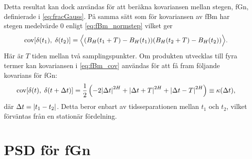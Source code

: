 Detta resultat kan dock användas för att beräkna kovariansen mellan stegen, fGn, definierade i \eqref{eq:fracGauss}. På samma sätt som för kovariansen av fBm har stegen medelvärde 0 enligt  \eqref{eq:fBm_normstep} vilket ger
\begin{equation}
    \text{cov}\!\left[\delta(t_1),\;\delta(t_2)\right] = \Big\langle(B_H(t_1+T)-B_H(t_1))(B_H(t_2+T)-B_H(t_2))\Big\rangle.
\end{equation}
Här är $T$ tiden mellan två samplingspunkter. Om produkten utvecklas till fyra termer kan kovariansen i \eqref{eq:fBm_cov} användas för att få fram följande kovarians för fGn:
\begin{equation} \label{eq:fGn_cov}
    \text{cov}\!\left[\delta(t),\;\delta(t+\Delta{t})\right] 
    = \frac{1}{2}
    \left(-2\abs{\Delta{t}}^{2H}+\abs{\Delta{t}+T}^{2H}+\abs{\Delta{t}-T}^{2H}\right) 
    \equiv \kappa(\Delta{t}),
\end{equation}
där $\Delta{t}=\abs{t_1-t_2}$.
Detta beror enbart av tidsseparationen mellan $t_1$ och $t_2$, vilket förväntas från en stationär fördelning.





\section{PSD för fGn}
\label{sec:PSD_fGn}

